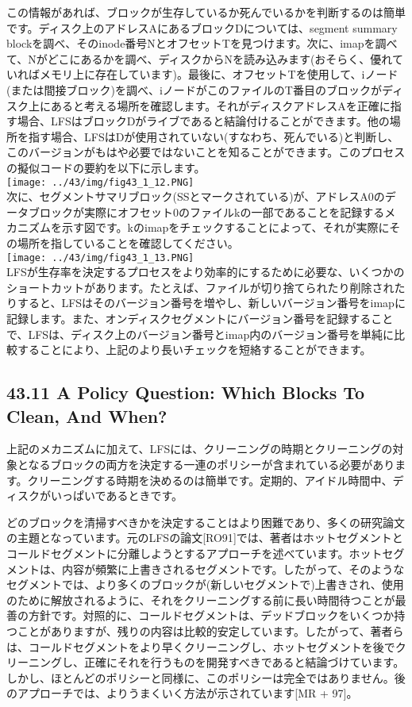 この情報があれば、ブロックが生存しているか死んでいるかを判断するのは簡単です。ディスク上のアドレスAにあるブロックDについては、segment
summary
blockを調べ、そのinode番号NとオフセットTを見つけます。次に、imapを調べて、Nがどこにあるかを調べ、ディスクからNを読み込みます(おそらく、優れていればメモリ上に存在しています)。最後に、オフセットTを使用して、iノード(または間接ブロック)を調べ、iノードがこのファイルのT番目のブロックがディスク上にあると考える場所を確認します。それがディスクアドレスAを正確に指す場合、LFSはブロックDがライブであると結論付けることができます。他の場所を指す場合、LFSはDが使用されていない(すなわち、死んでいる)と判断し、このバージョンがもはや必要ではないことを知ることができます。このプロセスの擬似コードの要約を以下に示します。\\
\texttt{[image: ../43/img/fig43\_1\_12.PNG]}\\
次に、セグメントサマリブロック(SSとマークされている)が、アドレスA0のデータブロックが実際にオフセット0のファイルkの一部であることを記録するメカニズムを示す図です。kのimapをチェックすることによって、それが実際にその場所を指していることを確認してください。\\
\texttt{[image: ../43/img/fig43\_1\_13.PNG]}\\
LFSが生存率を決定するプロセスをより効率的にするために必要な、いくつかのショートカットがあります。たとえば、ファイルが切り捨てられたり削除されたりすると、LFSはそのバージョン番号を増やし、新しいバージョン番号をimapに記録します。また、オンディスクセグメントにバージョン番号を記録することで、LFSは、ディスク上のバージョン番号とimap内のバージョン番号を単純に比較することにより、上記のより長いチェックを短絡することができます。

\hypertarget{a-policy-question-which-blocks-to-clean-and-when}{%
\subsection*{43.11 A Policy Question: Which Blocks To Clean, And
When?}\label{a-policy-question-which-blocks-to-clean-and-when}}

上記のメカニズムに加えて、LFSには、クリーニングの時期とクリーニングの対象となるブロックの両方を決定する一連のポリシーが含まれている必要があります。クリーニングする時期を決めるのは簡単です。定期的、アイドル時間中、ディスクがいっぱいであるときです。

どのブロックを清掃すべきかを決定することはより困難であり、多くの研究論文の主題となっています。元のLFSの論文{[}RO91{]}では、著者はホットセグメントとコールドセグメントに分離しようとするアプローチを述べています。ホットセグメントは、内容が頻繁に上書きされるセグメントです。したがって、そのようなセグメントでは、より多くのブロックが(新しいセグメントで)上書きされ、使用のために解放されるように、それをクリーニングする前に長い時間待つことが最善の方針です。対照的に、コールドセグメントは、デッドブロックをいくつか持つことがありますが、残りの内容は比較的安定しています。したがって、著者らは、コールドセグメントをより早くクリーニングし、ホットセグメントを後でクリーニングし、正確にそれを行うものを開発すべきであると結論づけています。しかし、ほとんどのポリシーと同様に、このポリシーは完全ではありません。後のアプローチでは、よりうまくいく方法が示されています{[}MR
+ 97{]}。

